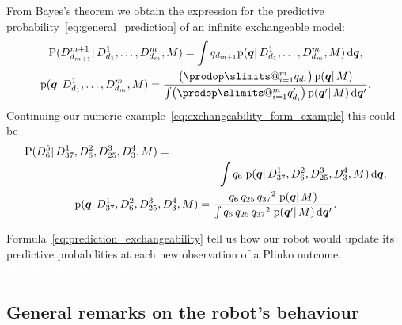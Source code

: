 \documentclass[\ifafour a4paper,12pt,\else a5paper,10pt,\fi%
onecolumn,oneside,article,%
british%
]{memoir}
\makeatletter
\theoremstyle{remark}
\theoremstyle{innote}
\def\prod{\DOTSI\prodop\slimits@}
\newcommand*{\di}{\mathrm{d}}%
\newcommand*{\pf}{\mathrm{p}}%
\newcommand*{\p}{\mathrm{P}}%
\renewcommand*{\|}{\mathpunct{|}}
\newcommand*{\yqq}{q}
\newcommand*{\yq}{\bm{\yqq}}
\makeatother
\begin{document}
From Bayes's theorem we obtain the expression for the predictive
probability~\eqref{eq:general_prediction} of an infinite exchangeable model:
\begin{subequations}\label{eq:prediction_exchangeability}
  \begin{gather}
    \p(D^{m+1}_{d_{m+1}}\| D^1_{d_1}, \dotsc , D^m_{d_m} , M)
    = \int \yqq_{d_{m+1}} \pf(\yq \| D^1_{d_1}, \dotsc, D^m_{d_m}, M)\,\di\yq,
    \\
    \pf(\yq \| D^1_{d_1}, \dotsc, D^m_{d_m}, M)
    = \frac{ \bigl( \prod_{i=1}^m \yqq_{d_i} \bigr)\, \pf(\yq \| M)
      }{
      \int  \bigl( \prod_{i=1}^m \yqq_{d_i}' \bigr)\, \pf(\yq' \| M)\,\di\yq'
      }.
\label{eq:exchang_updated_prior}
  \end{gather}
\end{subequations}
Continuing our numeric example~\eqref{eq:exchangeability_form_example} this
could be
\begin{subequations}\label{eq:prediction_exchangeability_example}
  \begin{gather}
    \begin{multlined}[][0.95\linewidth]
    \p(D^5_{6} \| D^1_{37} , D^2_{6} , D^3_{25}, D^4_{3}, M)
    ={}\\ \int \yqq_{6}\; \pf(\yq \|  D^1_{37} , D^2_{6} , D^3_{25}, D^4_{3}, M)\,\di\yq,
  \end{multlined}
    \\
    \pf(\yq \|  D^1_{37} , D^2_{6} , D^3_{25}, D^4_{3}, M)
    = \frac{ \yqq_{6}\, \yqq_{25} \, {\yqq_{37}}^2\; \pf(\yq \| M)
      }{
      \int \yqq_{6}\, \yqq_{25} \, {\yqq_{37}}^2\; \pf(\yq' \| M)\,\di\yq'
      }.
  \end{gather}
\end{subequations}


Formula~\eqref{eq:prediction_exchangeability} tell us how our robot would
update its predictive probabilities at each new observation of a Plinko outcome.
\textcolor{white}{If you find this you can claim a postcard from me.}
%


\subsection{General remarks on the robot's behaviour}
\label{sec:remarks}
\end{document}
